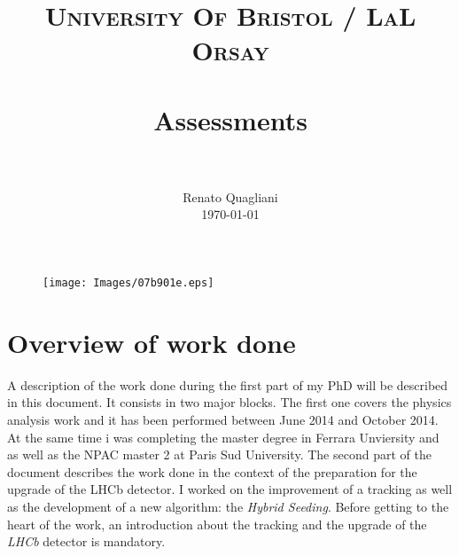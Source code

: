 \documentclass[paper=a4, fontsize=10pt]{scrartcl}
\title{
		\usefont{OT1}{bch}{b}{n}
		\normalfont \normalsize \textsc{University Of Bristol / LaL Orsay} \\ [25pt]
		\horrule{0.5pt} \\[0.4cm]
		\huge Assessments \\
		\horrule{2pt} \\[0.5cm]
}
\author{
		\normalfont 								\normalsize
        Renato Quagliani\\[-3pt]		\normalsize
        \today
}
\date{}
\numberwithin{equation}{section}		%
\numberwithin{figure}{section}			%
\numberwithin{table}{section}				%
\begin{document}
\maketitle
\begin{figure}
\begin{center}
\texttt{[image: Images/07b901e.eps]}
\end{center}
\end{figure}
\section{Overview of work done}
A description of the work done during the first part of my PhD will be described in this document. It consists in two major blocks. The first one covers the physics analysis work and it has been performed between June 2014 and October 2014. At the same time i was completing the master degree in Ferrara Unviersity and as well as the NPAC master 2 at Paris Sud University. The second part of the document describes the work done in the context of the preparation for the upgrade of the LHCb detector. I worked on the improvement of a tracking as well as the development of a new algorithm: the \textit{Hybrid Seeding}.
Before getting to the heart of the work, an introduction about the tracking and the upgrade of the \textit{LHCb} detector is mandatory.
\end{document}
